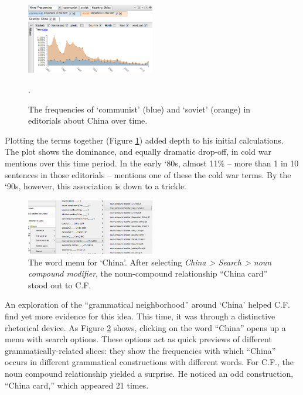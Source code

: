 \documentclass{sig-alternate}
\begin{document}
\begin{figure}[h!]
\includegraphics[width=0.5\textwidth]{fig/chris/04b.png}
\caption{The frequencies of `communist' (blue) and `soviet' (orange) in editorials about China over time. \label{fig:chris04b}}.
\end{figure}

Plotting the terms together (Figure \ref{fig:chris04b}) added depth to his initial calculations.  The plot shows the dominance, and equally dramatic drop-off, in cold war mentions over this time period. In the early `80s, almost 11\% -- more than 1 in 10 sentences in those editorials -- mentions one of these the cold war terms. By the `90s, however, this association is down to a trickle. 

\begin{figure}[h!]
\includegraphics[width=0.5\textwidth]{fig/chris/01.png}
\caption{The word menu for `China'.   After selecting \emph{China > Search > noun compound modifier}, the noun-compound relationship ``China card'' stood out to C.F. \label{fig:chris01}}
\end{figure}

An exploration of the ``grammatical neighborhood'' around `China'  helped C.F. find yet more evidence for this idea. This time, it was through a distinctive rhetorical device. As Figure \ref{fig:chris01} shows, clicking on the word ``China'' opens up a menu with search options. These options act as quick previews of different grammatically-related slices: they show the frequencies with which ``China'' occurs in different grammatical constructions with different words.  For C.F., the noun compound relationship yielded a surprise. He noticed an odd construction, ``China card,'' which appeared 21 times.
\end{document}
